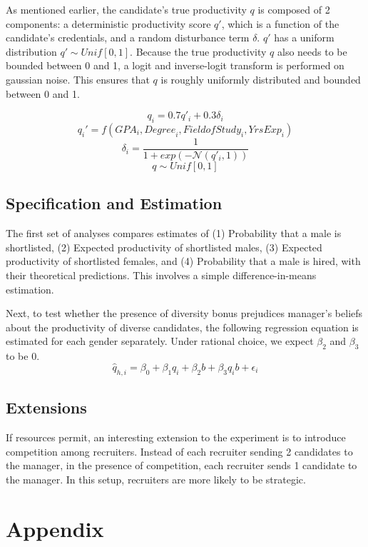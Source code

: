 \documentclass[11pt]{article}
\newcommand{\Unif}{\textit{Unif}[0,1]}
\begin{document}
As mentioned earlier, the candidate's true productivity $q$ is composed of 2 components: a deterministic productivity score $q'$, which is a function of the candidate's credentials, and a random disturbance term $\delta$. $q'$ has a uniform distribution $q' \sim \Unif$. Because the true productivity $q$ also needs to be bounded between 0 and 1, a logit and inverse-logit transform is performed on gaussian noise. This ensures that $q$ is roughly uniformly distributed and bounded between 0 and 1.

$$q_i        = 0.7q'_i + 0.3\delta_i$$
$$q_i'= f(\textit{GPA}_i, \textit{Degree}_i, \textit{FieldofStudy}_i, \textit{YrsExp}_i)$$
$$\delta_i = \frac{1}{1+ exp(-\mathcal{N}(q'_i, 1))}$$
$$q \sim \Unif$$

\subsection{Specification and Estimation}

The first set of analyses compares estimates of (1) Probability that a male is shortlisted, (2) Expected productivity of shortlisted males, (3) Expected productivity of shortlisted females, and (4) Probability that a male is hired, with their theoretical predictions. This involves a simple difference-in-means estimation.

Next, to test whether the presence of diversity bonus prejudices manager's beliefs about the productivity of diverse candidates, the following regression equation is estimated for each gender separately. Under rational choice, we expect $\beta_2$ and $\beta_3$ to be 0.
$$\hat{q}_{h,i} = \beta_0 + \beta_1q_i + \beta_2 b + \beta_3 q_i b + \epsilon_i$$

\subsection{Extensions}

If resources permit, an interesting extension to the experiment is to introduce competition among recruiters. Instead of each recruiter sending 2 candidates to the manager, in the presence of competition, each recruiter sends 1 candidate to the manager. In this setup, recruiters are more likely to be strategic.

\printbibliography

\newpage
\section*{Appendix}
\end{document}
